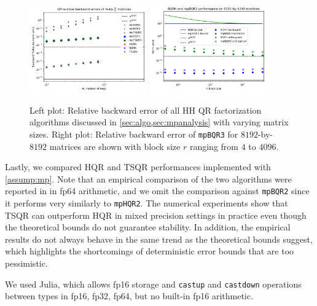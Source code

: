 \begin{figure}[h!]%
	\centering
	\vspace{-10pt}
	\includegraphics[width=0.45\textwidth]{./figures/sizefig.png}
	\includegraphics[width=0.45\textwidth]{./figures/mpBQR3-blocksize.png}
	\caption{\label{fig:sizempBQR3}Left plot: Relative backward error of all HH QR factorization algorithms discussed in \cref{sec:algo,sec:mpanalysis} with varying matrix sizes. Right plot: Relative backward error of {\tt mpBQR3} for $8192$-by-$8192$ matrices are shown with block size $r$ ranging from $4$ to $4096$.}
	\vspace{-10pt}
\end{figure} 
Lastly, we compared HQR and TSQR performances implemented with \cref{assump:mp}.
Note that an empirical comparison of the two algorithms were reported in \cite{Mori2012} in fp64 arithmetic, and we omit the comparison against {\tt mpBQR2} since it performs very similarly to {\tt mpHQR2}.
The numerical experiments show that TSQR can outperform HQR in mixed precision settings in practice even though the theoretical bounds do not guarantee stability.
In addition, the empirical results do not always behave in the same trend as the theoretical bounds suggest, which highlights the shortcomings of deterministic error bounds that are too pessimistic. \par
We used Julia, which allows fp16 storage and {\tt castup} and {\tt castdown} operations between types in {fp16, fp32, fp64}, but no built-in fp16 arithmetic.
